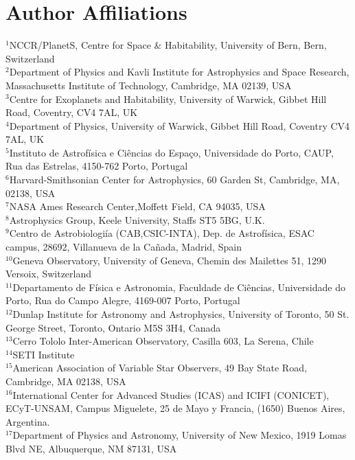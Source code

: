 \documentclass[fleqn,usenatbib]{mnras}
\begin{document}
\section{Author Affiliations}\label{sec:affiliations}
$^{1}$NCCR/PlanetS, Centre for Space \& Habitability, University of Bern, Bern, Switzerland\\
$^{2}$Department of Physics and Kavli Institute for Astrophysics and Space Research, Massachusetts Institute of Technology, Cambridge, MA 02139, USA\\
$^{3}$Centre for Exoplanets and Habitability, University of Warwick, Gibbet Hill Road, Coventry, CV4 7AL, UK\\
$^{4}$Department of Physics, University of Warwick, Gibbet Hill Road, Coventry CV4 7AL, UK\\
$^{5}$Instituto de Astrof\'isica e Ci\^encias do Espa\c{c}o, Universidade do Porto, CAUP, Rua das Estrelas, 4150-762 Porto, Portugal\\
$^{6}$Harvard-Smithsonian Center for Astrophysics, 60 Garden St, Cambridge, MA, 02138, USA\\
$^{7}$NASA Ames Research Center,Moffett Field, CA 94035, USA\\
$^{8}$Astrophysics Group, Keele University, Staffs ST5 5BG, U.K. \\
$^{9}$Centro de Astrobiologi\'ia (CAB,CSIC-INTA), Dep. de Astrof\'isica, ESAC campus, 28692, Villanueva de la Ca\~nada, Madrid, Spain\\
$^{10}$Geneva Observatory, University of Geneva, Chemin des Mailettes 51, 1290 Versoix, Switzerland\\
$^{11}$Departamento de F\'isica e Astronomia, Faculdade de Ci\^{e}ncias, Universidade do Porto, Rua do Campo Alegre, 4169-007 Porto, Portugal\\
$^{12}$Dunlap Institute for Astronomy and Astrophysics, University of Toronto, 50 St. George Street, Toronto, Ontario M5S 3H4, Canada\\
$^{13}$Cerro Tololo Inter-American Observatory, Casilla 603, La Serena, Chile\\
$^{14}$SETI Institute\\
$^{15}$American Association of Variable Star Observers, 49 Bay State Road, Cambridge, MA 02138, USA\\
$^{16}$International Center for Advanced Studies (ICAS) and ICIFI (CONICET), ECyT-UNSAM, Campus Miguelete, 25 de Mayo y Francia, (1650) Buenos Aires, Argentina.\\
$^{17}$Department of Physics and Astronomy, University of New Mexico, 1919 Lomas Blvd NE, Albuquerque, NM 87131, USA\\
\end{document}
